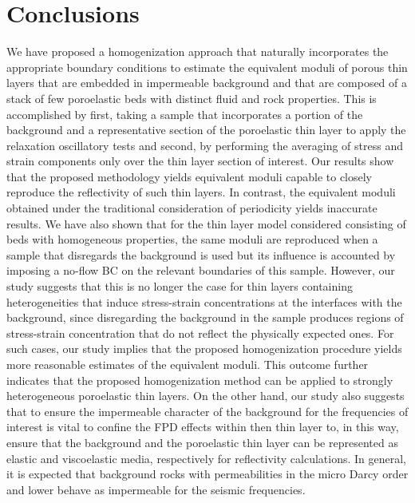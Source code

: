 \documentclass[draft]{agujournal2019}
\begin{document}
\section{Conclusions}
We have proposed a homogenization approach that naturally incorporates the appropriate boundary conditions to estimate the equivalent moduli of porous thin layers that are embedded in impermeable background and that are composed of a stack of few poroelastic beds with distinct fluid and rock properties.
This is accomplished by first, taking a sample that incorporates a portion of the background and a representative section of the poroelastic thin layer to apply the relaxation oscillatory tests and second, by performing the averaging of stress and strain components only over the thin layer section of interest.
Our results show that the proposed methodology yields equivalent moduli capable to closely reproduce the reflectivity of such thin layers. In contrast, the equivalent moduli obtained under the traditional consideration of periodicity yields inaccurate results. We  have also shown that for the thin layer model considered consisting of beds with homogeneous properties, the same moduli are reproduced when a sample that disregards the background is used but its influence is accounted by imposing a no-flow BC on the relevant boundaries of this sample. However, our study suggests that this is no longer the case for thin layers containing heterogeneities that induce stress-strain concentrations at the interfaces with the background, since disregarding the background in the sample produces regions of stress-strain concentration that do not reflect the physically expected ones. For such cases, our study implies that the proposed homogenization procedure yields more reasonable estimates of the equivalent moduli. This outcome further indicates that the proposed homogenization method can be applied to strongly heterogeneous poroelastic thin layers.
On the other hand, our study also suggests that to ensure the impermeable character
of the background for the frequencies of interest is vital to confine the FPD effects within then thin layer to, in this way, ensure that the background and the poroelastic thin layer can be represented as elastic and viscoelastic media, respectively for reflectivity calculations. In general, it is expected that background rocks with permeabilities in the micro Darcy order and lower behave as impermeable for the seismic frequencies.


\appendix
\end{document}
